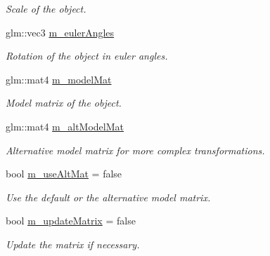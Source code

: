 \begin{DoxyCompactItemize}
\begin{DoxyCompactList}\small\item\em Scale of the object. \end{DoxyCompactList}\item 
\mbox{\label{class_object_a2b740c7fb22122a34286e0181fc69c8a}} 
glm\+::vec3 \hyperlink{class_object_a2b740c7fb22122a34286e0181fc69c8a}{m\+\_\+euler\+Angles}
\begin{DoxyCompactList}\small\item\em Rotation of the object in euler angles. \end{DoxyCompactList}\item 
\mbox{\label{class_object_a63576ab555502bfb8de52e0f75b0d012}} 
glm\+::mat4 \hyperlink{class_object_a63576ab555502bfb8de52e0f75b0d012}{m\+\_\+model\+Mat}
\begin{DoxyCompactList}\small\item\em Model matrix of the object. \end{DoxyCompactList}\item 
\mbox{\label{class_object_aa8ca8a51906713190326b0b2667d975e}} 
glm\+::mat4 \hyperlink{class_object_aa8ca8a51906713190326b0b2667d975e}{m\+\_\+alt\+Model\+Mat}
\begin{DoxyCompactList}\small\item\em Alternative model matrix for more complex transformations. \end{DoxyCompactList}\item 
bool \hyperlink{class_object_ac7370557bcc44f3054712733de22d9ee}{m\+\_\+use\+Alt\+Mat} = false
\begin{DoxyCompactList}\small\item\em Use the default or the alternative model matrix. \end{DoxyCompactList}\item 
\mbox{\label{class_object_a4e7183f8631f7473e648138facdee129}} 
bool \hyperlink{class_object_a4e7183f8631f7473e648138facdee129}{m\+\_\+update\+Matrix} = false
\begin{DoxyCompactList}\small\item\em Update the matrix if necessary. \end{DoxyCompactList}\end{DoxyCompactItemize}


